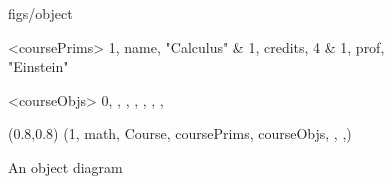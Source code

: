 






\begin {figure}


\Draw

 {figs/object}


\Indirect \Table <coursePrims>
{  1, name, "Calculus"			&
   1, credits, 4         		&
   1, prof, "Einstein"
}


\Indirect \Table <courseObjs>
 {  0, , , , , , , }
  


\Scale (0.8,0.8)
\Obj (1, math, Course, coursePrims, courseObjs, , ,)
    
\EndDraw

\caption {An object diagram}

\label {fig:course}

\end {figure}



